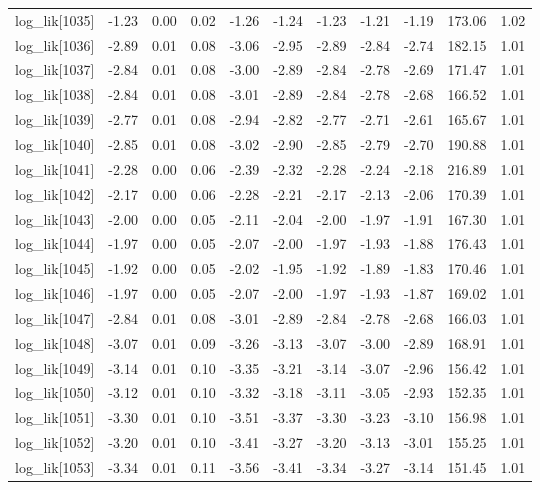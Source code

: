 \begin{table}[ht]
\begin{tabular}{rrrrrrrrrrr}
  log\_lik[1035] & -1.23 & 0.00 & 0.02 & -1.26 & -1.24 & -1.23 & -1.21 & -1.19 & 173.06 & 1.02 \\ 
  log\_lik[1036] & -2.89 & 0.01 & 0.08 & -3.06 & -2.95 & -2.89 & -2.84 & -2.74 & 182.15 & 1.01 \\ 
  log\_lik[1037] & -2.84 & 0.01 & 0.08 & -3.00 & -2.89 & -2.84 & -2.78 & -2.69 & 171.47 & 1.01 \\ 
  log\_lik[1038] & -2.84 & 0.01 & 0.08 & -3.01 & -2.89 & -2.84 & -2.78 & -2.68 & 166.52 & 1.01 \\ 
  log\_lik[1039] & -2.77 & 0.01 & 0.08 & -2.94 & -2.82 & -2.77 & -2.71 & -2.61 & 165.67 & 1.01 \\ 
  log\_lik[1040] & -2.85 & 0.01 & 0.08 & -3.02 & -2.90 & -2.85 & -2.79 & -2.70 & 190.88 & 1.01 \\ 
  log\_lik[1041] & -2.28 & 0.00 & 0.06 & -2.39 & -2.32 & -2.28 & -2.24 & -2.18 & 216.89 & 1.01 \\ 
  log\_lik[1042] & -2.17 & 0.00 & 0.06 & -2.28 & -2.21 & -2.17 & -2.13 & -2.06 & 170.39 & 1.01 \\ 
  log\_lik[1043] & -2.00 & 0.00 & 0.05 & -2.11 & -2.04 & -2.00 & -1.97 & -1.91 & 167.30 & 1.01 \\ 
  log\_lik[1044] & -1.97 & 0.00 & 0.05 & -2.07 & -2.00 & -1.97 & -1.93 & -1.88 & 176.43 & 1.01 \\ 
  log\_lik[1045] & -1.92 & 0.00 & 0.05 & -2.02 & -1.95 & -1.92 & -1.89 & -1.83 & 170.46 & 1.01 \\ 
  log\_lik[1046] & -1.97 & 0.00 & 0.05 & -2.07 & -2.00 & -1.97 & -1.93 & -1.87 & 169.02 & 1.01 \\ 
  log\_lik[1047] & -2.84 & 0.01 & 0.08 & -3.01 & -2.89 & -2.84 & -2.78 & -2.68 & 166.03 & 1.01 \\ 
  log\_lik[1048] & -3.07 & 0.01 & 0.09 & -3.26 & -3.13 & -3.07 & -3.00 & -2.89 & 168.91 & 1.01 \\ 
  log\_lik[1049] & -3.14 & 0.01 & 0.10 & -3.35 & -3.21 & -3.14 & -3.07 & -2.96 & 156.42 & 1.01 \\ 
  log\_lik[1050] & -3.12 & 0.01 & 0.10 & -3.32 & -3.18 & -3.11 & -3.05 & -2.93 & 152.35 & 1.01 \\ 
  log\_lik[1051] & -3.30 & 0.01 & 0.10 & -3.51 & -3.37 & -3.30 & -3.23 & -3.10 & 156.98 & 1.01 \\ 
  log\_lik[1052] & -3.20 & 0.01 & 0.10 & -3.41 & -3.27 & -3.20 & -3.13 & -3.01 & 155.25 & 1.01 \\ 
  log\_lik[1053] & -3.34 & 0.01 & 0.11 & -3.56 & -3.41 & -3.34 & -3.27 & -3.14 & 151.45 & 1.01 \\ 

\end{tabular}
\end{table}
